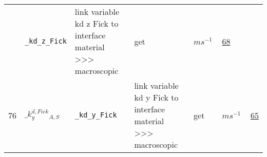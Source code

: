 \begin{longtable}{|p{1cm}|p{2.5cm}|p{4.5cm}|p{8cm}|p{3.0cm}|p{3cm}|p{1cm}|}
             & \verb|_kd_z_Fick|
             & link variable kd z Fick to interface material >>> macroscopic
             & \begin{lay}get \end{lay}
             & $ m s^{-1} \, $
             &                 \hyperlink{"e:68"}{ 68 }
                 \\
            76
             & \hypertarget{"v:76"}{ $ {{\_k^{d,Fick}_y}}{_{A, S}} $}
             & \verb|_kd_y_Fick|
             & link variable kd y Fick to interface material >>> macroscopic
             & \begin{lay}get \end{lay}
             & $ m s^{-1} \, $
             &                 \hyperlink{"e:65"}{ 65 }
                 \\
    \end{longtable}
